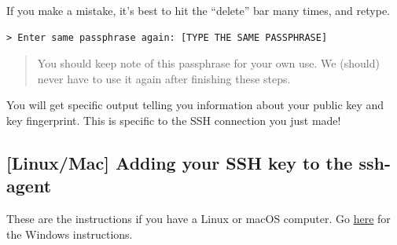 \documentclass[
]{book}
\newenvironment{redbox}{
  \definecolor{shadecolor}{RGB}{243, 154, 157}
  \color{white}
  \begin{shaded}}
 {\end{shaded}}
\theoremstyle{definition}
\theoremstyle{definition}
\theoremstyle{definition}
\theoremstyle{definition}
\theoremstyle{remark}
\begin{document}
\begin{enumerate}
\begin{redbox}
  If you make a mistake, it's best to hit the ``delete'' bar many times, and retype.

  \end{redbox}

\begin{verbatim}
> Enter same passphrase again: [TYPE THE SAME PASSPHRASE]
\end{verbatim}

  \begin{quote}
  You should keep note of this passphrase for your own use. We (should) never have to use it again after finishing these steps.
  \end{quote}

  You will get specific output telling you information about your public key and key fingerprint. This is specific to the SSH connection you just made!
\end{enumerate}

\subsection{{[}Linux/Mac{]} Adding your SSH key to the ssh-agent}\label{linuxmac-adding-your-ssh-key-to-the-ssh-agent}

These are the instructions if you have a Linux or macOS computer. Go \hyperref[windows-add-ssh-key]{here} for the Windows instructions.
\end{document}
